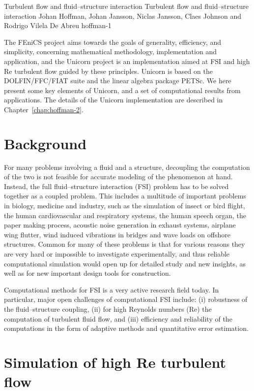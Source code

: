              {Turbulent flow and fluid--structure interaction}
              {Turbulent flow and fluid--structure interaction}
              {Johan Hoffman, Johan Jansson, Niclas Jansson, Claes Johnson and Rodrigo Vilela De Abreu}
              {hoffman-1}

The FEniCS project aims towards the goals of generality, efficiency,
and simplicity, concerning mathematical methodology, implementation
and application, and the Unicorn project is an implementation aimed at
FSI and high Re turbulent flow guided by these principles. Unicorn is
based on the DOLFIN/FFC/FIAT suite and the linear algebra package
PETSc. We here present some key elements of Unicorn, and a set of
computational results from applications. The details of the Unicorn
implementation are described in Chapter~\ref{chap:hoffman-2}.

\section{Background}
For many problems involving a fluid and a structure, decoupling the
computation of the two is not feasible for accurate modeling of the
phenomenon at hand. Instead, the full fluid--structure interaction (FSI)
problem has to be solved together as a coupled problem. This includes a
multitude of important problems in biology, medicine and industry, such
as the simulation of insect or bird flight, the human cardiovascular
and respiratory systems, the human speech organ, the paper making
process, acoustic noise generation in exhaust systems, airplane wing
flutter, wind induced vibrations in bridges and wave loads on offshore
structures. Common for many of these problems is that for various reasons
they are very hard or impossible to investigate experimentally, and thus
reliable computational simulation would open up for detailed study and
new insights, as well as for new important design tools for construction.

Computational methods for FSI is a very active research field today. In
particular, major open challenges of computational FSI include: (i)
robustness of the fluid--structure coupling, (ii) for high Reynolds
numbers (Re) the computation of turbulent fluid flow, and (iii) efficiency
and reliability of the computations in the form of adaptive methods and
quantitative error estimation.

\section{Simulation of high Re turbulent flow}

